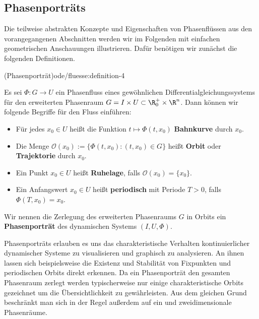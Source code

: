 \documentclass[letterpaper,10pt,english]{jupyterBook}
\begin{document}
\subsection{Phasenporträts}
\label{\detokenize{ode/fluesse:phasenportrats}}
\par
Die teilweise abstrakten Konzepte und Eigenschaften von Phasenflüssen aus den vorangegangenen Abschnitten werden wir im Folgenden mit einfachen geometrischen Anschauungen illustrieren.
Dafür benötigen wir zunächst die folgenden Definitionen.
\begin{definition}{(Phasenporträt)}{ode/fluesse:definition-4}



\par
Es sei \(\Phi:G\rightarrow U\) ein Phasenfluss eines gewöhnlichen Differentialgleichungssystems für den erweiterten Phasenraum \(G = I \times U\subset \R^+_0\times \R^n\).
Dann können wir folgende Begriffe für den Fluss einführen:
\begin{itemize}
\item {} 
\par
Für jedes \(x_0\in U\) heißt die Funktion \(t\mapsto \Phi(t, x_0)\) \textbf{Bahnkurve} durch \(x_0\).

\item {} 
\par
Die Menge \(\mathcal{O}(x_0) := \{\Phi(t, x_0): (t, x_0)\in G\}\) heißt \textbf{Orbit} oder \textbf{Trajektorie} durch \(x_0\).

\item {} 
\par
Ein Punkt \(x_0 \in U\) heißt \textbf{Ruhelage}, falls \(\mathcal{O}(x_0) = \{x_0\}\).

\item {} 
\par
Ein Anfangswert \(x_0\in U\) heißt \textbf{periodisch} mit Periode \(T>0\), falls \(\Phi(T, x_0) = x_0\).

\end{itemize}

\par
Wir nennen die Zerlegung des erweiterten Phasenraums \(G\) in Orbits ein \textbf{Phasenporträt} des dynamischen Systems \((I,U, \Phi)\).
\end{definition}

\par
Phasenporträts erlauben es uns das charakteristische Verhalten kontinuierlicher dynamischer Systeme zu visualisieren und graphisch zu analysieren.
An ihnen lassen sich beispielsweise die Existenz und Stabilität von Fixpunkten und periodischen Orbits direkt erkennen.
Da ein Phasenporträt den gesamten Phasenraum zerlegt werden typischerweise nur einige charakteristische Orbits gezeichnet um die Übersichtlichkeit zu gewährleisten.
Aus dem gleichen Grund beschränkt man sich in der Regel außerdem auf ein  und zweidimensionale Phasenräume.
\end{document}
